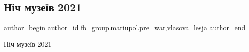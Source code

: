  
 
 
 
 

\subsection{Ніч музеїв 2021}
\label{sec:14_01_2023.fb.fb_group.mariupol.pre_war.2.n_ch_muze_v_2021}
 
\ifcmt
 author_begin
   author_id fb_group.mariupol.pre_war,vlasova_lesja
 author_end
\fi

Ніч музеїв 2021

